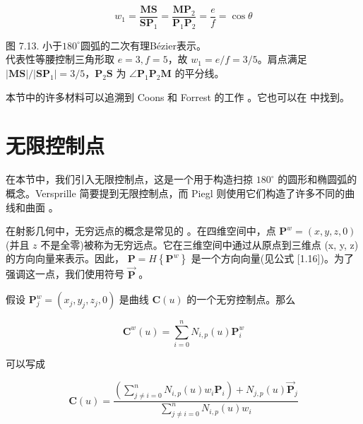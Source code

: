 \documentclass[../main.tex]{subfiles}
\begin{document}
\[
{w}_{1} = \frac{\mathbf{{MS}}}{{\mathbf{{SP}}}_{1}} = \frac{{\mathbf{{MP}}}_{2}}{{\mathbf{P}}_{1}{\mathbf{P}}_{2}} = \frac{e}{f} = \cos \theta  \tag{7.33}
\]

\begin{center}
\begin{minipage}{18cm}
\vspace*{.6\baselineskip}
\centering
{}
\par\smallskip
图 7.13. 小于$180^\circ$圆弧的二次有理Bézier表示。\\
代表性等腰控制三角形取 $e=3,f=5$，故 $w_1=e/f=3/5$。肩点满足 $|\mathbf{MS}|/|\mathbf{SP}_1|=3/5$，$\mathbf P_2\mathbf S$ 为 $\angle\mathbf P_1\mathbf P_2\mathbf M$ 的平分线。
\end{minipage}
\end{center}

本节中的许多材料可以追溯到 Coons 和 Forrest 的工作 \cite{Coon67,Ahuj68,Forr68}。它也可以在 \cite{Lee87,Pieg87a} 中找到。


\section{无限控制点}
在本节中，我们引入无限控制点，这是一个用于构造扫掠 \({180}^{ \circ  }\) 的圆形和椭圆弧的概念。Versprille \cite{Vers75} 简要提到无限控制点，而 Piegl 则使用它们构造了许多不同的曲线和曲面 \cite{Pieg87c,Pieg88a,Pieg88b}。

在射影几何中，无穷远点的概念是常见的 \cite{Ahuj68,Coxe74,Ries81}。在四维空间中，点 \({\mathbf{P}}^{w} = \left( {x,y,z,0}\right)\) (并且 \(z\) 不是全零)被称为无穷远点。它在三维空间中通过从原点到三维点 (x, y, z) 的方向向量来表示。因此， \(\mathbf{P} = H\left\{  {\mathbf{P}}^{w}\right\}\) 是一个方向向量(见公式 [1.16])。为了强调这一点，我们使用符号 \(\overrightarrow{\mathbf{P}}\) 。



假设 \({\mathbf{P}}_{j}^{w} = \left( {{x}_{j},{y}_{j},{z}_{j},0}\right)\) 是曲线 \(\mathbf{C}\left( u\right)\) 的一个无穷控制点。那么

\[
{\mathbf{C}}^{w}\left( u\right)  = \mathop{\sum }\limits_{{i = 0}}^{n}{N}_{i,p}\left( u\right) {\mathbf{P}}_{i}^{w}
\]

可以写成

\[
\mathbf{C}\left( u\right)  = \frac{\left( {\mathop{\sum }\limits_{{j \neq  i = 0}}^{n}{N}_{i,p}\left( u\right) {w}_{i}{\mathbf{P}}_{i}}\right)  + {N}_{j,p}\left( u\right) {\overrightarrow{\mathbf{P}}}_{j}}{\mathop{\sum }\limits_{{j \neq  i = 0}}^{n}{N}_{i,p}\left( u\right) {w}_{i}}
\]
\end{document}
